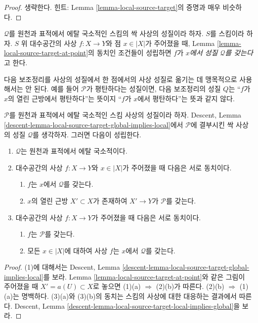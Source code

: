 \begin{proof}
생략한다. 힌트: Lemma \ref{lemma-local-source-target}의 증명과 매우
비슷하다.
\end{proof}

\begin{definition}
\label{definition-P-at-point}
$\mathcal{Q}$를 원천과 표적에서 에탈 국소적인 스킴의 싹 사상의
성질이라 하자. $S$를 스킴이라 하자.
$S$ 위 대수공간의 사상 $f : X \to Y$와 점
$x \in |X|$가 주어졌을 때, Lemma
\ref{lemma-local-source-target-at-point}의 동치인 조건들이 성립하면
$f$가 {\it $x$에서 성질 $\mathcal{Q}$를 갖는다}고 한다.
\end{definition}

\noindent
다음 보조정리를 사상의 성질에서 한 점에서의 사상 성질로 옮기는 데
맹목적으로 사용해서는 안 된다. 예를 들어
$\mathcal{P}$가 평탄하다는 성질이면, 다음 보조정리의 성질
$Q$는 “$f$가 $x$의 열린 근방에서 평탄하다”는 뜻이지
“$f$가 $x$에서 평탄하다”는 뜻과 같지 않다.

\begin{lemma}
\label{lemma-local-source-target-global-implies-local}
$\mathcal{P}$를 원천과 표적에서 에탈 국소적인 스킴 사상의
성질이라 하자. Descent, Lemma
\ref{descent-lemma-local-source-target-global-implies-local}에서
$\mathcal{P}$에 결부시킨 싹 사상의 성질 $\mathcal{Q}$를 생각하자.
그러면 다음이 성립한다.
\begin{enumerate}
\item $\mathcal{Q}$는 원천과 표적에서 에탈 국소적이다.
\item 대수공간의 사상 $f : X \to Y$와 $x \in |X|$가 주어졌을 때
다음은 서로 동치이다.
\begin{enumerate}
\item $f$는 $x$에서 $\mathcal{Q}$를 갖는다.
\item $x$의 열린 근방 $X' \subset X$가 존재하여
$X' \to Y$가 $\mathcal{P}$를 갖는다.
\end{enumerate}
\item 대수공간의 사상 $f : X \to Y$가 주어졌을 때
다음은 서로 동치이다.
\begin{enumerate}
\item $f$는 $\mathcal{P}$를 갖는다.
\item 모든 $x \in |X|$에 대하여 사상 $f$는 $x$에서
$\mathcal{Q}$를 갖는다.
\end{enumerate}
\end{enumerate}
\end{lemma}

\begin{proof}
(1)에 대해서는 Descent, Lemma
\ref{descent-lemma-local-source-target-global-implies-local}를 보라.
Lemma \ref{lemma-local-source-target-at-point}와 같은 그림이 주어졌을
때 $X' = a(U) \subset X$로 놓으면 (1)(a) $\Rightarrow$ (2)(b)가
따른다. (2)(b) $\Rightarrow$ (1)(a)는 명백하다.
(3)(a)와 (3)(b)의 동치는 스킴의 사상에 대한 대응하는 결과에서
따른다. Descent, Lemma
\ref{descent-lemma-local-source-target-local-implies-global}을 보라.
\end{proof}

